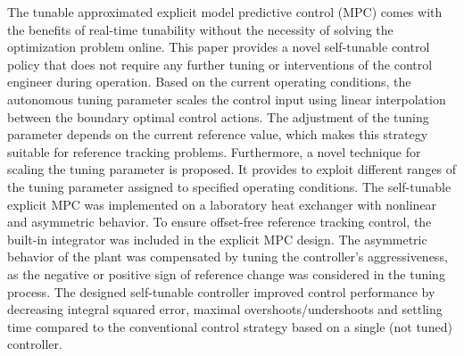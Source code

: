 \documentclass[preprint,12pt]{elsarticle}
\begin{document}
		The tunable approximated explicit model predictive control (MPC) comes with the benefits of real-time tunability without the necessity of solving the optimization problem online. This paper provides a novel self-tunable control policy that does not require any further tuning or interventions of the control engineer during operation. Based on the current operating conditions, the autonomous tuning parameter scales the control input using linear interpolation between the boundary optimal control actions. The adjustment of the tuning parameter depends on the current reference value, which makes this strategy suitable for reference tracking problems. Furthermore, a novel technique for scaling the tuning parameter is proposed. It provides to exploit different ranges of the tuning parameter assigned to specified operating conditions. The self-tunable explicit MPC was implemented on a laboratory heat exchanger with nonlinear and asymmetric behavior. To ensure offset-free reference tracking control, the built-in integrator was included in the explicit MPC design. The asymmetric behavior of the plant was compensated by tuning the controller's aggressiveness, as the negative or positive sign of reference change was considered in the tuning process. The designed self-tunable controller improved control performance by decreasing integral squared error, maximal overshoots/undershoots and settling time compared to the conventional control strategy based on a single (not tuned) controller. 
	
\end{document}

